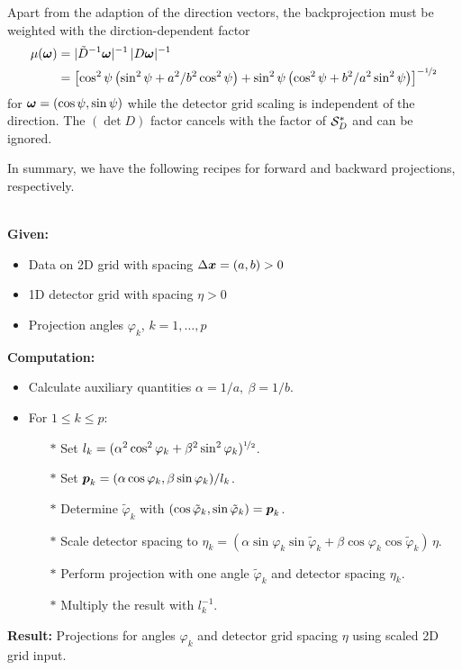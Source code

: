 \documentclass{amsart}
\renewcommand*{\phi}{\varphi}
\begin{document}
%
Apart from the adaption of the direction vectors, the backprojection must be weighted with the dirction-dependent factor
%
\begin{align*}
 \mu({\boldsymbol{\omega}}) 
 &= |\tilde D^{-1} {\boldsymbol{\omega}}|^{-1}\, |D {\boldsymbol{\omega}}|^{-1} \\
 &= \left[\cos^2\psi \left(\sin^2\psi + a^2/b^2 \cos^2\psi\right) + \sin^2\psi \left(\cos^2\psi + b^2/a^2 
 \sin^2\psi\right)\right]^{-{\nicefrac{1}{2}}}
\end{align*}
%
for ${\boldsymbol{\omega}} = (\cos\psi, \sin\psi)$ while the detector grid scaling is independent of the direction. The $(\det D)$ factor cancels with 
the factor of ${\mathcal{S}}_D^*$ and can be ignored.

In summary, we have the following recipes for forward and backward projections, respectively.

\begin{algorithm}~\\[2ex]
 \textbf{Given:}
 \begin{itemize}
  \item Data on 2D grid with spacing $\Delta{\boldsymbol{x}} = (a, b) > 0$
  \item 1D detector grid with spacing $\eta > 0$
  \item Projection angles $\phi_k$, $k = 1, \ldots, p$
 \end{itemize}
 \vspace*{2ex}
 \textbf{Computation:}
 \begin{itemize}
  \item Calculate auxiliary quantities $\alpha = 1 / a,\ \beta = 1 / b$.
  \item For $1 \leq k \leq p$:
  \begin{itemize}
   \item[$\ast$] Set $l_k = (\alpha^2 \cos^2\phi_k + \beta^2 \sin^2\phi_k)^{\HALF}$.
   \item[$\ast$] Set $\Bp_k = (\alpha \cos\phi_k, \beta \sin\phi_k) / l_k$.
   \item[$\ast$] Determine $\tilde\phi_k$ with $(\cos\tilde\phi_k, \sin\tilde\phi_k) = \Bp_k$.
   \item[$\ast$] Scale detector spacing to $\eta_k = (\alpha \sin\phi_k \sin\tilde\phi_k + \beta \cos\phi_k \cos\tilde\phi_k)\, \eta$.
   \item[$\ast$] Perform projection with one angle $\tilde\phi_k$ and detector spacing $\eta_k$.
   \item[$\ast$] Multiply the result with $l_k^{-1}$.
  \end{itemize}
 \end{itemize}
 \vspace*{2ex}
 \textbf{Result:} Projections for angles $\phi_k$ and detector grid spacing $\eta$ using scaled 2D grid input.
\end{algorithm}
\end{document}
